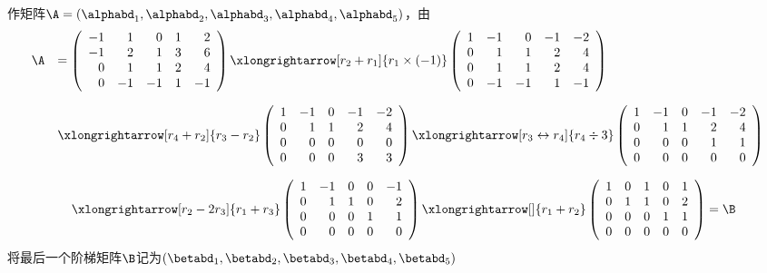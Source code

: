 \begin{jie}
作矩阵$\A=(\alphabd_1,\alphabd_2,\alphabd_3,\alphabd_4,\alphabd_5)$，由
$$
\begin{array}{rl}
  \A &= \left(
       \begin{array}{rrrrr}
         -1&1&0&1&2\\
         -1&2&1&3&6\\
         0&1&1&2&4\\
         0&-1&-1&1&-1
       \end{array}
                    \right) \xlongrightarrow[r_2+r_1]{ r_1\times(-1)}
                    \left(
                    \begin{array}{rrrrr}
                      1&-1&0&-1&-2\\
                      0&1&1&2&4\\
                      0&1&1&2&4\\
                      0&-1&-1&1&-1
                    \end{array}
                                 \right)\\[0.4in]
     &\xlongrightarrow[r_4+r_2]{r_3- r_2}
       \left(
       \begin{array}{rrrrr}
         1&-1&0&-1&-2\\
         0&1&1&2&4\\
         0&0&0&0&0\\
         0&0&0&3&3
       \end{array}
                  \right) \xlongrightarrow[r_3\leftrightarrow r_4]{r_4\div 3}
                  \left(
                  \begin{array}{rrrrr}
                    1&-1&0&-1&-2\\
                    0&1&1&2&4\\
                    0&0&0&1&1\\
                    0&0&0&0&0
                  \end{array}
                             \right)
\end{array}
$$

$$
\begin{array}{rl}
  & \xlongrightarrow[r_2 -2 r_3]{r_1+r_3}
    \left(
    \begin{array}{rrrrr}
      1&-1&0&0&-1\\
      0&1&1&0&2\\
      0&0&0&1&1\\
      0&0&0&0&0
    \end{array}
               \right) \xlongrightarrow[]{r_1+r_2}
               \left(
               \begin{array}{rrrrr}
                 1&0&1&0&1\\
                 0&1&1&0&2\\
                 0&0&0&1&1\\
                 0&0&0&0&0
               \end{array}
                          \right) = \B
\end{array}
$$
将最后一个阶梯矩阵$\B$记为$(\betabd_1,\betabd_2,\betabd_3,\betabd_4,\betabd_5)$


\end{jie}
